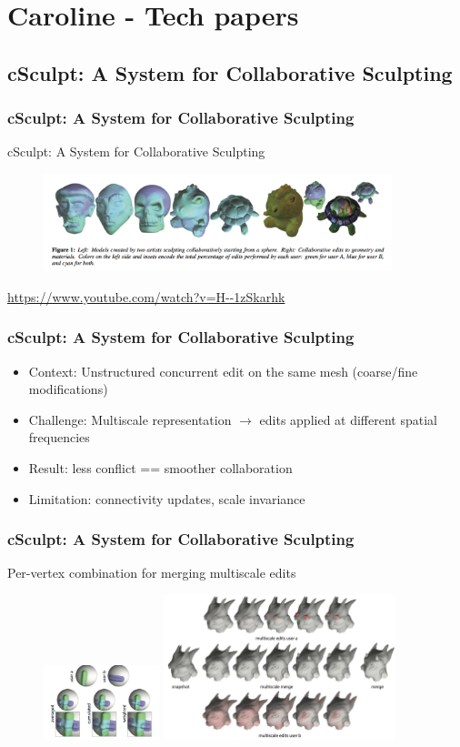 \section{Caroline - Tech papers}
\subsection{cSculpt: A System for Collaborative Sculpting}
\frame
{
  \frametitle{cSculpt: A System for Collaborative Sculpting}
cSculpt: A System for Collaborative Sculpting \cite{Calabrese:2016}

\begin{figure}
\centering
\includegraphics[width=0.9\textwidth]{img/csculpt/summ2.png}
\end{figure}
\centering
\url{https://www.youtube.com/watch?v=H--1zSkarhk}
}
\frame
{
	\frametitle{cSculpt: A System for Collaborative Sculpting}
	\begin{itemize}[<+->]
		\item Context: Unstructured concurrent edit on the same mesh (coarse/fine modifications)
		
		\item Challenge: Multiscale representation $\rightarrow$ edits applied at different spatial frequencies
		
		\item Result: less conflict  == smoother collaboration
		\item Limitation: connectivity updates, scale invariance
	\end{itemize}
}
\frame
{
	\frametitle{cSculpt: A System for Collaborative Sculpting}
	Per-vertex combination for merging multiscale edits
	\begin{figure}
		\centering
		\includegraphics[width=0.3\textwidth]{img/csculpt/combi.png}
		\includegraphics[width=0.6\textwidth]{img/csculpt/merge.png}
	\end{figure}
}


